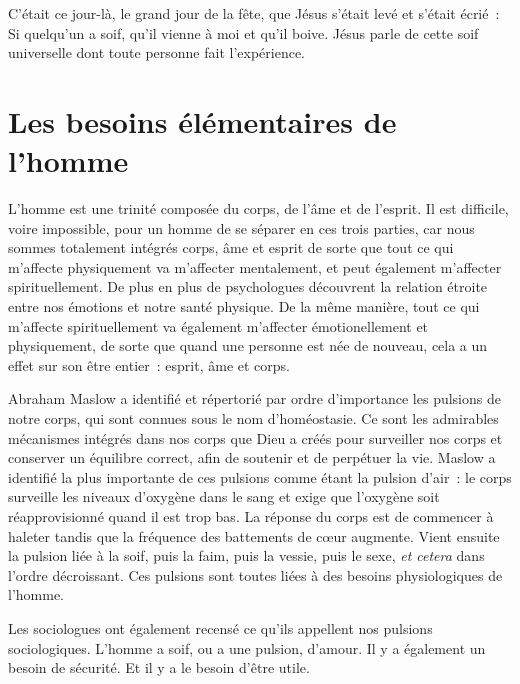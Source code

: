\begin{specialpar}{}
C'était ce jour-là, le grand jour de la fête, que Jésus s'était levé
 et s'était écrié~:
 \og Si quelqu'un a soif, qu'il vienne à moi et qu'il boive. \fg{}
 Jésus parle de cette soif universelle dont toute personne fait l'expérience.
\end{specialpar}


\section{Les besoins \'el\'ementaires de l'homme}


\begin{specialpar}{}
L'homme est une trinité composée du corps, de l'âme et de l'esprit.
 Il est difficile, voire impossible, pour un homme de se séparer
 en ces trois parties, car nous sommes totalement intégrés
 \ocadr corps, âme et esprit \fcadr{} de sorte
 que tout ce qui m'affecte
 physiquement va m'affecter mentalement, et peut également m'affecter
 spirituellement.
 De plus en plus de psychologues découvrent la relation étroite
 entre nos émotions et notre santé physique.
 De la même manière, tout ce qui m'affecte spirituellement
 va également m'affecter émotionellement et physiquement,
 de sorte que quand une personne est née de nouveau,
 cela a un effet sur son être entier~: esprit, âme et corps.
\end{specialpar}

Abraham Maslow a identifié et répertorié par ordre d'importance
 les pulsions de notre corps, qui sont connues sous le nom d'homéo\-stasie.
 Ce sont les admirables mécanismes intégrés dans nos corps que Dieu
 a créés pour surveiller nos corps et conserver un équilibre correct,
 afin de soutenir et de perpétuer la vie.
 Maslow a identifié la plus importante de ces pulsions comme étant
 la pulsion d'air~: le corps surveille les niveaux d'oxygène dans le sang
 et exige que l'oxygène soit réapprovisionné quand il est trop bas.
 La réponse du corps est de commencer à haleter tandis que la fréquence
 des battements de cœur augmente.
 Vient ensuite la pulsion liée à la soif, puis la faim, puis la vessie,
 puis le sexe, \emph{et cetera} dans l'ordre décroissant.
 Ces pulsions sont toutes liées à des besoins physiologiques de l'homme.

Les sociologues ont également recensé ce qu'ils appellent nos pulsions
 sociologiques. L'homme a soif, ou a une pulsion, d'amour.
 Il y a également un besoin de sécurité. Et il y a le besoin d'être utile.

